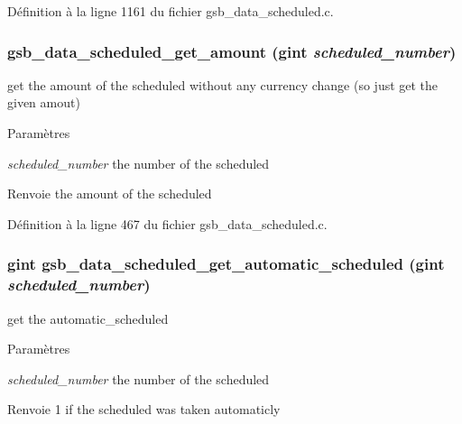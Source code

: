 Définition à la ligne 1161 du fichier gsb\_\-data\_\-scheduled.c.

\subsubsection[{gsb\_\-data\_\-scheduled\_\-get\_\-amount}]{ gsb\_\-data\_\-scheduled\_\-get\_\-amount (gint {\em scheduled\_\-number})}\label{gsb__data__scheduled_8c_a60f83f62f6ca02e7b786ed30a1b9e6c6}
get the amount of the scheduled without any currency change (so just get the given amout)


\begin{DoxyParams}{Paramètres}
\item[{\em scheduled\_\-number}]the number of the scheduled\end{DoxyParams}
\begin{DoxyReturn}{Renvoie}
the amount of the scheduled 
\end{DoxyReturn}


Définition à la ligne 467 du fichier gsb\_\-data\_\-scheduled.c.

\subsubsection[{gsb\_\-data\_\-scheduled\_\-get\_\-automatic\_\-scheduled}]{\setlength{\rightskip}{0pt plus 5cm}gint gsb\_\-data\_\-scheduled\_\-get\_\-automatic\_\-scheduled (gint {\em scheduled\_\-number})}\label{gsb__data__scheduled_8c_ae5f2deb3539449512d8e9c3bc3011525}
get the automatic\_\-scheduled


\begin{DoxyParams}{Paramètres}
\item[{\em scheduled\_\-number}]the number of the scheduled\end{DoxyParams}
\begin{DoxyReturn}{Renvoie}
1 if the scheduled was taken automaticly 
\end{DoxyReturn}


